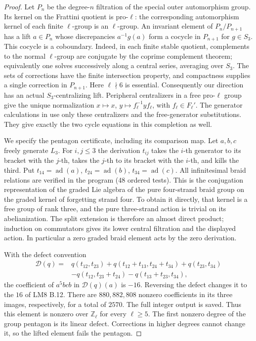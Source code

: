 \begin{proof}
Let $P_n$ be the degree-$n$ filtration of the special outer
automorphism group. Its kernel on the Frattini quotient is pro-$\ell$:
the corresponding automorphism kernel of each finite $\ell$-group is
an $\ell$-group. An invariant element of $P_n/P_{n+1}$ has a lift
$a\in P_n$ whose discrepancies $a^{-1}g(a)$ form a cocycle in
$P_{n+1}$ for $g\in S_3$. This cocycle is a coboundary. Indeed, in
each finite stable quotient, complements to the normal $\ell$-group
are conjugate by the coprime complement theorem; equivalently one
solves successively along a central series, averaging over $S_3$.
The sets of corrections have the finite intersection property, and
compactness supplies a single correction in $P_{n+1}$. Here
$\ell\nmid6$ is essential. Consequently our direction has an actual
$S_3$-centralizing lift. Peripheral centralizers in a free pro-$\ell$
group give the unique normalization
$x\mapsto x$, $y\mapsto f_\ell^{-1}yf_\ell$, with
$f_\ell\in F_\ell'$. The generator calculations in
\cite[\S1.3, Propositions 3--4 and Theorem 2]{PBC_HS2000} use only
these centralizers and the free-generator substitutions. They give
exactly the two cycle equations in this completion as well.

We specify the pentagon certificate, including its comparison map.
Let $a,b,c$ freely generate $L_3$. For $i,j\leq3$ the derivation
$t_{ij}$ takes the $i$-th generator to its bracket with the $j$-th,
takes the $j$-th to its bracket with the $i$-th, and kills the third.
Put $t_{14}=\operatorname{ad}(a)$,
$t_{24}=\operatorname{ad}(b)$, $t_{34}=\operatorname{ad}(c)$.
All infinitesimal braid relations are verified in the program
(48 ordered tests). This is the conjugation representation of the
graded Lie algebra of the pure four-strand braid group on the graded
kernel of forgetting strand four. To obtain it directly, that kernel
is a free group of rank three, and the pure three-strand action is
trivial on its abelianization. The split extension is therefore an
almost direct product; induction on commutators gives its lower
central filtration and the displayed action. In particular a zero
graded braid element acts by the zero derivation.

With the defect convention
\[
\begin{split}
 \mathcal D(q)={}&q(t_{12},t_{23})
 +q(t_{12}+t_{13},t_{24}+t_{34})+q(t_{23},t_{34})\\
 &-q(t_{12},t_{23}+t_{24})-q(t_{13}+t_{23},t_{34}),
\end{split}
\]
the coefficient of $a^5bcb$ in $\mathcal D(q)(a)$ is $-16$.
Reversing the defect changes it to the $16$ of LM8 B.12.
There are $880,882,808$ nonzero coefficients in its three images,
respectively, for a total of $2570$. The full integer output is
saved. Thus this element is nonzero over $\mathbb Z_\ell$ for
every $\ell\geq5$. The first nonzero degree of the group pentagon
is its linear defect. Corrections in higher degrees cannot change
it, so the lifted element fails the pentagon.
\end{proof}


